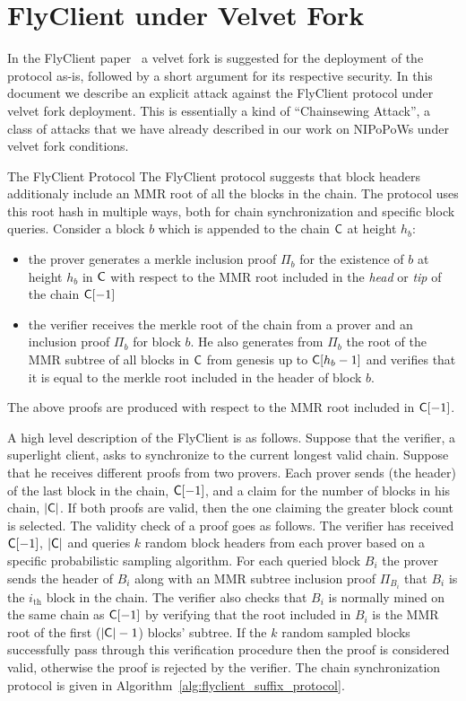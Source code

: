 \chapter{FlyClient under Velvet Fork}
In the FlyClient paper~\cite{flyclient} a velvet fork is suggested for the deployment of the protocol as-is, followed by a short argument for its respective security. In this document we describe an explicit attack against the FlyClient protocol under velvet fork deployment. This is essentially a kind of ``Chainsewing Attack'', a class of attacks that we have already described in our work on NIPoPoWs under velvet fork conditions.

\begin{section}{The FlyClient Protocol}
	The FlyClient protocol suggests that block headers additionaly include an MMR root of all the blocks in the chain. The protocol uses this root hash in multiple ways, both for chain synchronization and specific block queries. Consider a block $b$ which is appended to the chain $\mathsf{C}$ at height $h_b$: 
	\begin{itemize}
		\item the prover generates a merkle inclusion proof $\Pi_b$ for the existence of $b$ at height $h_b$ in $\mathsf{C}$ with respect to the MMR root included in the \emph{head} or \emph{tip} of the chain $\mathsf{C}[-1]$
		\item the verifier receives the merkle root of the chain from a prover and an inclusion proof $\Pi_b$ for block $b$. He also generates from $\Pi_b$ the root of the MMR subtree of all blocks in $\mathsf{C}$ from genesis up to $\mathsf{C}[h_b - 1]$ and verifies that it is equal to the merkle root included in the header of block $b$.
	\end{itemize}
	The above proofs are produced with respect to the MMR root included in $\mathsf{C}[-1]$.

	\vspace{2mm}
	\noindent
	A high level description of the FlyClient is as follows. Suppose that  the verifier, a superlight client, asks to synchronize to the current longest valid chain.  Suppose that he receives different proofs from two provers. Each prover sends (the header) of the last block in the chain, $\mathsf{C}[-1]$, and a claim for the number of blocks in his chain, $\lvert \mathsf{C} \rvert$. If both proofs are valid, then the one claiming the greater block count is selected. The validity check of a proof goes as follows. 
	The verifier has received $\mathsf{C}[-1]$, $\lvert \mathsf{C} \rvert$ and queries $k$ random block headers from each prover based on a specific probabilistic sampling algorithm. For each queried block $B_i$ the prover sends the header of $B_i$ along with an MMR subtree inclusion proof $\Pi_{B_i}$ that $B_i$ is the $i_\text{th}$ block in the chain. The verifier also checks that $B_i$ is normally mined on the same chain as $\mathsf{C}[-1]$ by verifying that the root included in $B_i$ is the MMR root of the first ($\lvert \mathsf{C} \rvert - 1$) blocks' subtree. If the $k$ random sampled blocks successfully pass through this verification procedure then the proof is considered valid, otherwise the proof is rejected by the verifier. 
	The chain synchronization protocol is given in Algorithm~\ref{alg:flyclient_suffix_protocol}.


\end{section}
